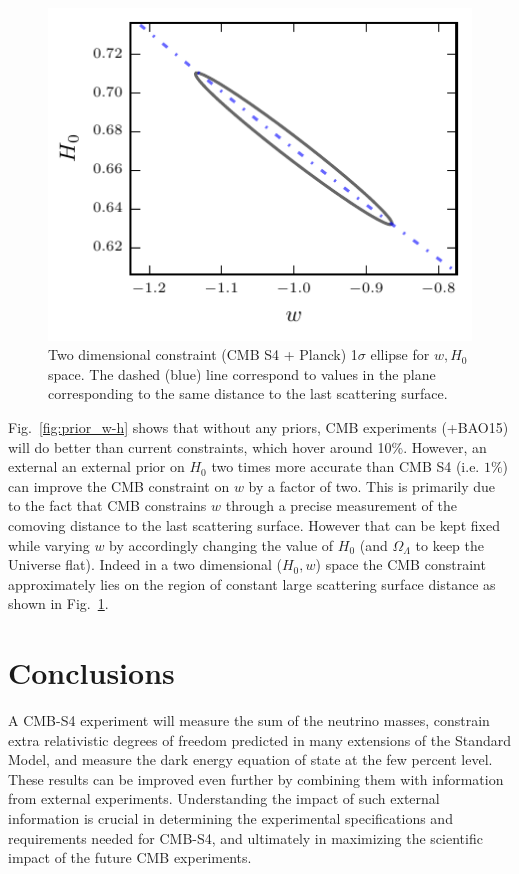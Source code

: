 \documentclass[aps,prd,reprint,superscriptaddress,nofootinbib,floatfix]{revtex4-1}
\newcommand{\reffig}[1]{Fig.~\ref{fig:#1}}
\begin{document}
\begin{figure}[htbp]
\begin{center}
\includegraphics{ellipse_H0_w.pdf}
\caption{Two dimensional constraint (CMB S4 + Planck) 1$\sigma$ ellipse for $w,H_{0}$ space. The dashed (blue) line correspond to values in the plane corresponding to the same distance to the last scattering surface.} 
\label{fig:ellipse_w_H0}
\end{center}
\end{figure}


\reffig{prior_w-h} shows that without any priors, CMB experiments (+BAO15) will do better than current constraints, which hover around 10\%. However, an external an external prior on $H_{0}$ two times more accurate than CMB S4 (i.e. $1\%$) can improve the CMB constraint on $w$ by a factor of two. 
This is primarily due to the fact that CMB constrains $w$ through a precise measurement of the comoving distance to the last scattering surface. However that can be kept fixed while varying $w$ by accordingly changing the value of $H_{0}$ (and $\Omega_{\Lambda}$ to keep the Universe flat). Indeed in a two dimensional ($H_{0},w$) space the CMB constraint approximately lies on the region of constant large scattering surface distance as shown in \reffig{ellipse_w_H0}.


\section{Conclusions \label{sec:conclusions}}
A CMB-S4 experiment will measure the sum of the neutrino masses, constrain extra relativistic degrees of freedom predicted in many extensions of the Standard Model, and measure the dark energy equation of state at the few percent level. 
These results can be improved even further by combining them with information from external experiments.
Understanding the impact of such external information is crucial in determining the experimental specifications and requirements needed for CMB-S4, and ultimately in maximizing the scientific impact of the future CMB experiments. 
\end{document}
